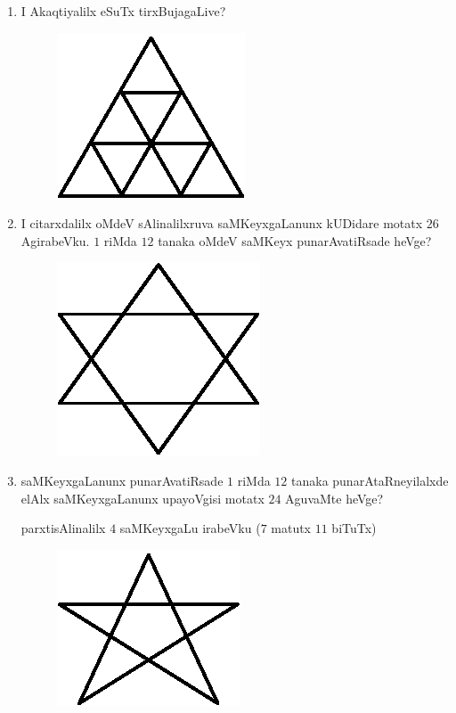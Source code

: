 \begin{enumerate}
\item I Akaqtiyalilx eSuTx tirxBujagaLive?
\begin{figure}[H]
\centering
\includegraphics{src/figures/exr22.eps}
\end{figure}

\item I citarxdalilx oMdeV sAlinalilxruva saMKeyxgaLanunx kUDidare motatx $26$ AgirabeVku. $1$ riMda $12$ tanaka oMdeV saMKeyx punarAvatiRsade heVge?
\begin{figure}[H]
\centering
\includegraphics{src/figures/exr23.eps}
\end{figure}

\item saMKeyxgaLanunx punarAvatiRsade $1$ riMda $12$ tanaka punarAtaRneyilalxde elAlx saMKeyxgaLanunx upayoVgisi motatx $24$ AguvaMte heVge?

parxtisAlinalilx $4$ saMKeyxgaLu irabeVku ($7$ matutx $11$ biTuTx)
\begin{figure}[H]
\centering
\includegraphics{src/figures/exr24.eps}
\end{figure}


\end{enumerate}
